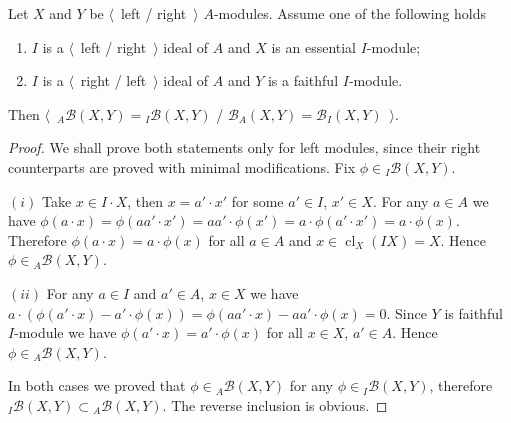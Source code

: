 \begin{proposition}\label{MorphCoincide} Let $X$ and $Y$ be $\langle$~left /
right~$\rangle$ $A$-modules. Assume one of the following holds

\begin{enumerate}[label = (\roman*)]
    \item $I$ is a $\langle$~left / right~$\rangle$ ideal of $A$ and $X$ is an
    essential $I$-module;

    \item $I$ is a $\langle$~right / left~$\rangle$ ideal of $A$ and $Y$ is a
    faithful $I$-module. 
\end{enumerate}

Then $\langle$~${}_A\mathcal{B}(X,Y)={}_I\mathcal{B}(X,Y)$ /
$\mathcal{B}_A(X,Y)=\mathcal{B}_I(X,Y)$~$\rangle$.
\end{proposition}
\begin{proof} We shall prove both statements only for left modules, since their
right counterparts are proved with minimal modifications. 
Fix $\phi\in{}_I\mathcal{B}(X,Y)$.

$(i)$ Take $x\in I\cdot X$, then $x=a'\cdot x'$ for some $a'\in I$, $x'\in X$.
For any $a\in A$ we have $\phi(a\cdot x)=\phi(aa'\cdot
x')=aa'\cdot\phi(x')=a\cdot\phi(a'\cdot x')=a\cdot\phi(x)$. Therefore
$\phi(a\cdot x)=a\cdot\phi(x)$ for all $a\in A$ 
and $x\in \operatorname{cl}_X(IX)=X$. Hence $\phi\in {}_A\mathcal{B}(X,Y)$.

$(ii)$ For any $a\in I$ and $a'\in A$, $x\in X$ we have $a\cdot(\phi(a'\cdot
x)-a'\cdot\phi(x))=\phi(aa'\cdot x)-aa'\cdot\phi(x)=0$. Since $Y$ is faithful
$I$-module we have $\phi(a'\cdot x)=a'\cdot \phi(x)$ for all $x\in X$, 
$a'\in A$. Hence $\phi\in{}_A\mathcal{B}(X,Y)$.

In both cases we proved that $\phi\in{}_A\mathcal{B}(X,Y)$ for any
$\phi\in{}_I\mathcal{B}(X,Y)$, 
therefore ${}_I\mathcal{B}(X,Y)\subset {}_A\mathcal{B}(X,Y)$. 
The reverse inclusion is obvious.
\end{proof}

